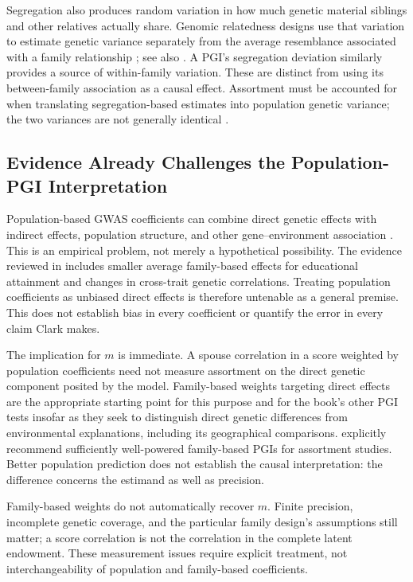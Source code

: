 Segregation also produces random variation in how much genetic material
siblings and other relatives actually share. Genomic relatedness designs
use that variation to estimate genetic variance separately from the average
resemblance associated with a family relationship
\citep{YoungEtAl2018}; see also \citet[Section~4.7]{BenjaminEtAl2026}. A PGI's segregation deviation similarly
provides a source of within-family variation. These are distinct from using
its between-family association as a causal effect. Assortment must be
accounted for when translating segregation-based estimates into population
genetic variance; the two variances are not generally identical
\citep{Young2023}.

\subsection{Evidence Already Challenges the Population-PGI Interpretation}
Population-based GWAS coefficients can combine direct genetic effects with
indirect effects, population structure, and other gene--environment
association \citep{YoungEtAl2019,YoungEtAl2022}. This is an empirical problem,
not merely a hypothetical possibility. %
The evidence reviewed in
\citet[Section~4.6]{BenjaminEtAl2026} includes smaller average family-based
effects for educational attainment and changes in cross-trait genetic
correlations. Treating population coefficients as unbiased direct effects
is therefore untenable as a general premise. This does not establish bias
in every coefficient or quantify the error in every claim Clark makes.

The implication for $m$ is immediate. A spouse correlation in a score
weighted by population coefficients need not measure assortment on the
direct genetic component posited by the model. Family-based weights targeting
direct effects are the appropriate starting point for this purpose and
for the book's other PGI tests insofar as they seek to distinguish direct
genetic differences from environmental explanations, including its
geographical comparisons. \citet[Section~6.4]{BenjaminEtAl2026} explicitly
recommend sufficiently well-powered family-based PGIs for assortment
studies. Better population prediction does not establish the causal
interpretation: the difference concerns the estimand as well as precision.

Family-based weights do not automatically recover $m$. Finite precision,
incomplete genetic coverage, and the particular family design's assumptions
still matter; a score correlation is not the correlation in the complete
latent endowment. These measurement issues require explicit treatment,
not interchangeability of population and family-based coefficients.

